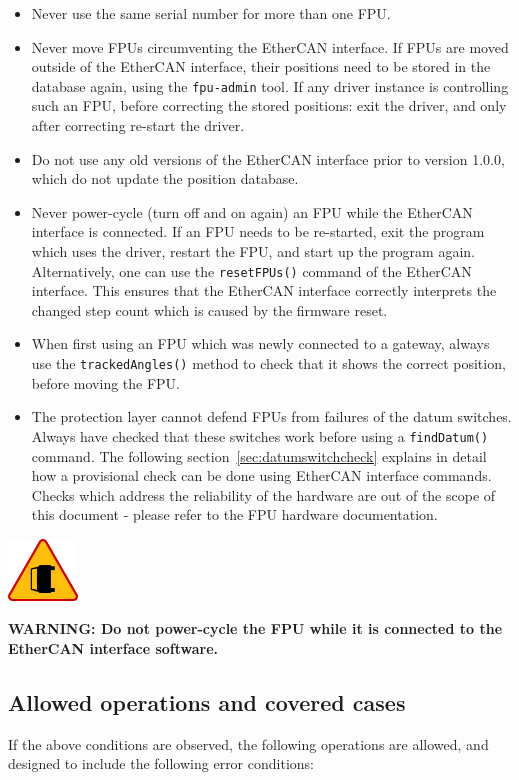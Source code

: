 \documentclass[11pt,a4paper]{report}
\newenvironment{warning}{\begin{framed}\includegraphics[width=5em]{accident-area-ahead.png}
}{\end{framed}}
\begin{document}
\begin{itemize}
  \item Never use the same serial number for more than one FPU.
  \item Never move FPUs circumventing the EtherCAN interface. If FPUs are moved
    outside of the EtherCAN interface, their positions need to be stored in the
    database again, using the \texttt{fpu-admin} tool. If any driver
    instance is controlling such an FPU, before correcting the stored
    positions: exit the driver, and only after correcting re-start the
    driver.
    
  \item Do not use any old versions of the EtherCAN interface prior to version
    1.0.0, which do not update the position database.
    
  \item Never power-cycle (turn off and on again) an FPU while the
    EtherCAN interface is connected. If an FPU needs to be re-started, exit the
    program which uses the driver, restart the FPU, and start up the
    program again.  Alternatively, one can use the
    \texttt{resetFPUs()} command of the EtherCAN interface. This ensures that the
    EtherCAN interface correctly interprets the changed step count which is caused
    by the firmware reset.
  \item When first using an FPU which was newly connected to a
    gateway, always use the \texttt{trackedAngles()} method to check
    that it shows the correct position, before moving the FPU.
  \item The protection layer cannot defend FPUs from failures of the
    datum switches. Always have checked that these switches work
    before using a \texttt{findDatum()} command. The following
    section~\ref{sec:datumswitchcheck} explains in detail how a
    provisional check can be done using EtherCAN interface commands. Checks which
    address the reliability of the hardware are out of the scope of
    this document - please refer to the FPU hardware documentation.
\end{itemize}

\begin{warning}
  \textbf{WARNING: Do not power-cycle the FPU while it is connected
    to the EtherCAN interface software.}
\end{warning}


\subsection{Allowed operations and covered cases}
If the above conditions are observed, the following operations are
allowed, and designed to include the following error conditions:
\end{document}
